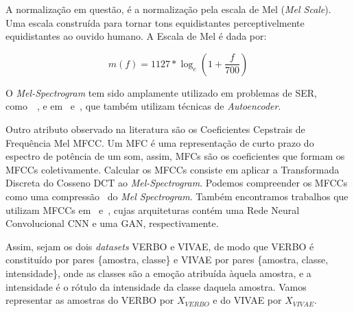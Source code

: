 A normalização em questão, é a normalização pela escala de Mel (\textit{Mel Scale}). Uma escala construída para tornar tons equidistantes perceptivelmente equidistantes ao ouvido humano. A Escala de Mel é dada por:

\begin{equation}
    m(f) = 1127 * \log_e{(1 + \frac{f}{700})}
\end{equation}

O \textit{Mel-Spectrogram} tem sido amplamente utilizado em problemas de \acrshort{SER}, como~\cite{32.25}~\cite{32.30}, e em~\cite{32.31} e~\cite{32.32}, que também utilizam técnicas de \textit{Autoencoder}.

Outro atributo observado na literatura são os Coeficientes Cepstrais de Frequência Mel \acrlong{MFCC}. Um \acrlong{MFC} é uma representação de curto prazo do espectro de potência de um som, assim, \acrshort{MFC}s são os coeficientes que formam os \acrshort{MFCC}s coletivamente. Calcular os \acrshort{MFCC}s consiste em aplicar a Transformada Discreta do Cosseno \acrlong{DCT} ao \textit{Mel-Spectrogram}. Podemos compreender os \acrshort{MFCC}s como uma compressão~\cite{64} do \textit{Mel Spectrogram}. Também encontramos trabalhos que utilizam \acrshort{MFCC}s em~\cite{32.79} e~\cite{32.89}, cujas arquiteturas contém uma Rede Neural Convolucional \acrlong{CNN} e uma \acrshort{GAN}, respectivamente.





Assim, sejam os dois \textit{datasets} VERBO e VIVAE, de modo que VERBO é constituído por pares \{amostra, classe\} e VIVAE por pares \{amostra, classe, intensidade\}, onde as classes são a emoção atribuída àquela amostra, e a intensidade é o rótulo da intensidade da classe daquela amostra. Vamos representar as amostras do VERBO por $X_{VERBO}$ e do VIVAE por $X_{VIVAE}$.

